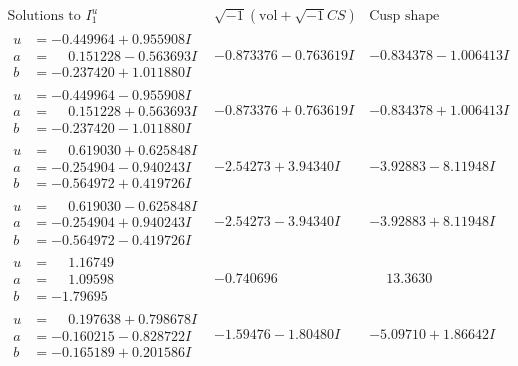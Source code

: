 \documentclass[1p]{elsarticle_modified}
\theoremstyle{definition}
\newcommand{\I}{\sqrt{-1}}
\begin{document}
$$\begin{array}{c|c|c}  
\text{Solutions to }I^u_{1}& \I (\text{vol} + \sqrt{-1}CS) & \text{Cusp shape}\\
 \hline 
\begin{aligned}
u &= -0.449964 + 0.955908 I \\
a &= \phantom{-}0.151228 - 0.563693 I \\
b &= -0.237420 + 1.011880 I\end{aligned}
 & -0.873376 - 0.763619 I & -0.834378 - 1.006413 I \\ \hline\begin{aligned}
u &= -0.449964 - 0.955908 I \\
a &= \phantom{-}0.151228 + 0.563693 I \\
b &= -0.237420 - 1.011880 I\end{aligned}
 & -0.873376 + 0.763619 I & -0.834378 + 1.006413 I \\ \hline\begin{aligned}
u &= \phantom{-}0.619030 + 0.625848 I \\
a &= -0.254904 - 0.940243 I \\
b &= -0.564972 + 0.419726 I\end{aligned}
 & -2.54273 + 3.94340 I & -3.92883 - 8.11948 I \\ \hline\begin{aligned}
u &= \phantom{-}0.619030 - 0.625848 I \\
a &= -0.254904 + 0.940243 I \\
b &= -0.564972 - 0.419726 I\end{aligned}
 & -2.54273 - 3.94340 I & -3.92883 + 8.11948 I \\ \hline\begin{aligned}
u &= \phantom{-}1.16749\phantom{ +0.000000I} \\
a &= \phantom{-}1.09598\phantom{ +0.000000I} \\
b &= -1.79695\phantom{ +0.000000I}\end{aligned}
 & -0.740696\phantom{ +0.000000I} & \phantom{-}13.3630\phantom{ +0.000000I} \\ \hline\begin{aligned}
u &= \phantom{-}0.197638 + 0.798678 I \\
a &= -0.160215 - 0.828722 I \\
b &= -0.165189 + 0.201586 I\end{aligned}
 & -1.59476 - 1.80480 I & -5.09710 + 1.86642 I \\ \hline\begin{aligned}

\end{aligned}
\end{array}$$
\end{document}
